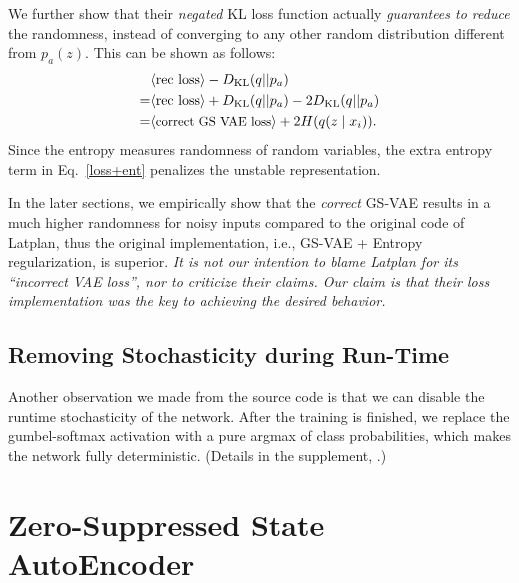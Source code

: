 We further show that their \emph{negated} KL loss function
actually \emph{guarantees to reduce} the randomness,
instead of converging to any other random distribution different from $p_a(z)$.
This can be shown as follows:
\begin{align} 
\nonumber  &\brackets{\text{rec loss}}-D_{\text{KL}}(q||p_a)                                    \\
\nonumber =&\brackets{\text{rec loss}}+D_{\text{KL}}(q||p_a) - 2 D_{\text{KL}}(q||p_a)          \\
\label{loss+ent} =&\brackets{\text{\small correct GS VAE loss}}      + 2 H(q(z \mid x_i)).
\end{align}
Since the entropy measures randomness of random variables,
the extra entropy term in Eq.~\eqref{loss+ent} penalizes the unstable representation.

In the later sections, we empirically show that the \emph{correct} GS-VAE results in
a much higher randomness for noisy inputs compared to the original code of Latplan,
thus the original implementation, i.e., GS-VAE + Entropy regularization, is superior.
% 
\emph{It is not our intention to blame Latplan for its ``incorrect VAE loss'',
nor to criticize their claims.
Our claim is that their loss implementation was the key to achieving the desired behavior.}

\subsection{Removing Stochasticity during Run-Time}

Another observation we made from the source code is that we can
disable the runtime stochasticity of the network.
After the training is finished, we replace the gumbel-softmax activation with
a pure argmax of class probabilities, which makes the network fully deterministic.
(Details in the supplement, .)

\section{Zero-Suppressed State AutoEncoder}
\label{zsae}

